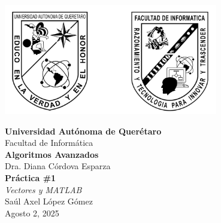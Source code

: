 \documentclass[12pt,a4paper]{article}
\begin{document}
\begin{titlepage}
    \begin{center}
        \includegraphics[width=0.7\textwidth]{images/logo_uaq_info.png}
        \vspace{1cm}

        {\Large \textbf{Universidad Autónoma de Querétaro}}\\[0.5cm]
        {\large Facultad de Informática}\\[1cm]

        {\Large \textbf{Algoritmos Avanzados}}\\[0.5cm]
        {\large Dra. Diana Córdova Esparza}\\[1.5cm]

        {\LARGE \textbf{Práctica \#1}}\\[0.2cm]
        {\large \textit{Vectores y MATLAB}}\\[1cm]

        {\large Saúl Axel López Gómez}\\[0.3cm]
        {\large Agosto 2, 2025}
    \end{center}
\end{titlepage}

\tableofcontents
\listoffigures
\listoftables
\lstlistoflistings
\clearpage







 


\end{document}

